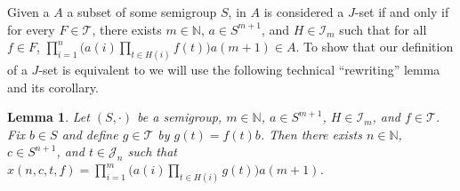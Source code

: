 \documentclass[12pt]{article}
\theoremstyle{plain}
\newtheorem{lem}[thm]{Lemma}
\theoremstyle{definition}
\newcommand{\bbN}{\mathbb{N}}
\newcommand{\calI}{\mathcal{I}}
\newcommand{\calJ}{\mathcal{J}}
\newcommand{\calT}{\mathcal{T}}
\begin{document}
Given a $A$ a subset of some semigroup $S$, in \cite[Definition 2.2(a)]{Hindman:2009vn} $A$ is considered a $J$-set if and only if for every $F \in \calT$, there exists $m \in \bbN$, $a \in S^{m+1}$, and $H \in \calI_m$ such that for all $f \in F$, $\prod_{i=1}^n\bigl( a(i) \prod_{t \in H(i)} f(t) \bigr) a(m+1) \in A$.
To show that our definition of a $J$-set is equivalent to \cite[Definition 2.2(a)]{Hindman:2009vn} we will use the following technical ``rewriting'' lemma and its corollary.

\begin{lem}
  \label{lem:rewrite-jset}
  Let $(S, \cdot)$ be a semigroup, $m \in \bbN$, $a \in S^{m+1}$, $H \in \calI_m$, and $f \in \calT$. 
  Fix $b \in S$ and define $g \in \calT$ by $g(t) = f(t)b$. 
  Then there exists $n \in \bbN$, $c \in S^{n+1}$, and $t \in \calJ_n$ such that $x(n, c, t, f) = \prod_{i=1}^m \bigl( a(i) \prod_{t \in H(i)} g(t)\big) a(m+1)$.
\end{lem}
\end{document}

